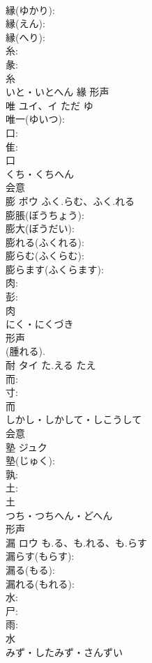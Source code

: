 \documentclass[8pt]{extreport}
\begin{document}
\begin{CJK}{UTF8}{min}
\\	縁(ゆかり): 
\\	縁(えん): 
\\	縁(へり): 
\\	糸: 
\\	彖: 
\\	糸	
\\	いと・いとへん	緣	形声 
\\	唯	ユイ、イ	ただ	ゆ	
\\	唯一(ゆいつ): 
\\	口: 
\\	隹: 
\\	口	
\\	くち・くちへん	
\\	会意 
\\	膨	ボウ	ふく.らむ、ふく.れる		
\\	膨脹(ぼうちょう): 
\\	膨大(ぼうだい): 
\\	膨れる(ふくれる): 
\\	膨らむ(ふくらむ): 
\\	膨らます(ふくらます): 
\\	肉: 
\\	彭: 
\\	肉	
\\	にく・にくづき	
\\	形声 
\\	(腫れる). 
\\	耐	タイ	た.える	たえ	
\\	而: 
\\	寸: 
\\	而	
\\	しかし・しかして・しこうして	
\\	会意 
\\	塾	ジュク			
\\	塾(じゅく): 
\\	孰: 
\\	土: 
\\	土	
\\	つち・つちへん・どへん	
\\	形声 
\\	漏	ロウ	も.る、も.れる、も.らす		
\\	漏らす(もらす): 
\\	漏る(もる): 
\\	漏れる(もれる): 
\\	水: 
\\	尸: 
\\	雨: 
\\	水	
\\	みず・したみず・さんずい	

\end{CJK}
\end{document}
